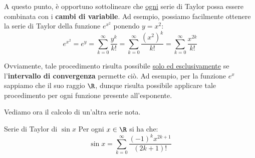 \documentclass[a4paper, 12pt]{report}
\begin{document}
    A questo punto, è opportuno sottolineare che \underline{ogni} serie di Taylor possa essere combinata con i \textbf{cambi di variabile}. Ad esempio, possiamo facilmente ottenere la serie di Taylor della funzione $e^{x^2}$ ponendo $y = x^2$:
    \[e^{x^2} = e^y = \sum_{k=0}^{\infty} \frac{y^k}{k!} = \sum_{k=0}^{\infty} \frac{(x^2)^k}{k!} = \sum_{k=0}^{\infty} \frac{x^{2k}}{k!}\]
                
    Ovviamente, tale procedimento risulta possibile \underline{solo ed esclusivamente} se l'\textbf{intervallo di convergenza} permette ciò. Ad esempio, per la funzione $e^x$ sappiamo che il suo raggio $\R$, dunque risulta possibile applicare tale procedimento per ogni funzione presente all'esponente.

    Vediamo ora il calcolo di un'altra serie nota.
    
    \begin{framedprop}{Serie di Taylor di $\sin x$}
        Per ogni $x \in \R$ si ha che:
        \[ \sin x =  \sum_{k=0}^{\infty} \frac{(-1)^k x^{2k+1}}{(2k+1)!}\]
    \end{framedprop}
\end{document}
